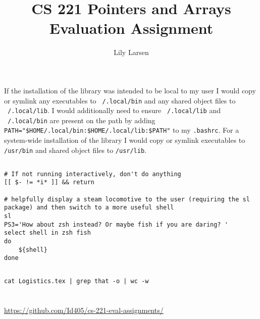 \documentclass{article}
\title{CS 221 Pointers and Arrays Evaluation Assignment}
\author{Lily Larsen}
\begin{document}
\maketitle
\newpage

\section{}
\subsection{}
If the installation of the library was intended to be local to my user I would copy or symlink any executables to \texttt{~/.local/bin} and any shared object files to \texttt{~/.local/lib}. I would additionally need to ensure \texttt{~/.local/lib} and \texttt{~/.local/bin} are present on the path by adding \\
\texttt{PATH="\$HOME/.local/bin:\$HOME/.local/lib:\$PATH"} to my \texttt{.bashrc}. For a system-wide installation of the library I would copy or symlink executables to \texttt{/usr/bin} and shared object files to \texttt{/usr/lib}.
\subsection{}
\begin{verbatim}
# If not running interactively, don't do anything
[[ $- != *i* ]] && return

# helpfully display a steam locomotive to the user (requiring the sl package) and then switch to a more useful shell
sl
PS3='How about zsh instead? Or maybe fish if you are daring? '
select shell in zsh fish
do
	${shell}
done
\end{verbatim}
\subsection{}
\begin{verbatim}
cat Logistics.tex | grep that -o | wc -w
\end{verbatim}
\newpage

\section{}
\subsection{}
\href{https://github.com/Id405/cs-221-eval-assignments/}{https://github.com/Id405/cs-221-eval-assignments/}
\end{document}
